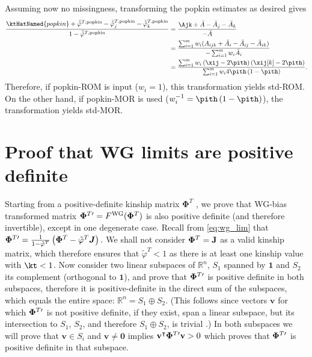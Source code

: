\documentclass[11pt]{article}
\newcommand{\kinMat}[1][T]{%
  \ensuremath{%
    \mathbf{\Phi}^{#1}
  }%
  \xspace%
}%
\newcommand{\kinMatPrime}{%
  \ensuremath{%
    \mathbf{\Phi}^{T\prime}
  }%
  \xspace%
}%
\begin{document}
\begin{appendices}
  Assuming now no missingness, transforming the popkin estimates as desired gives
  \begin{align*}
    \frac{
    \ktHatNamed{popkin}
    + \bar{ \hat{ \varphi } }^{T,\text{popkin}}
    - \bar{ \hat{ \varphi } }_j^{T,\text{popkin}}
    - \bar{ \hat{ \varphi } }_k^{T,\text{popkin}}
    }{
    1 - \bar{ \hat{ \varphi } }^{T,\text{popkin}}
    }
    &=
      \frac{
      \Ajk
      + \bar{A}
      - \bar{A}_j
      - \bar{A}_k
      }{
      - \bar{A}
      }
    \\
    &=
      \frac{
      \sum_{i=1}^m w_i ( A_{ijk} + \bar{A}_i - \bar{A}_{ij} - \bar{A}_{ik} )
      }{
      - \sum_{i=1}^m w_i \bar{A}_i
      }
    \\
    &=
      \frac{
      \sum_{i=1}^m w_i \left( \xij - 2 \pith \right) \left( \xij[k] - 2 \pith \right)
      }{
      \sum_{i=1}^m w_i 4 \pith \left( 1 - \pith \right)
      }
      .
  \end{align*}
  Therefore, if popkin-ROM is input ($w_i=1$), this transformation yields std-ROM.
  On the other hand, if popkin-MOR is used ($w_i^{-1} = \pith \left( 1 - \pith \right)$), the transformation yields std-MOR.
  
  \section{Proof that WG limits are positive definite}

  \label{sec:wg_posdef}

  Starting from a positive-definite kinship matrix \kinMat, we prove that WG-bias transformed matrix $\kinMatPrime = F^\text{WG}( \kinMat )$ is also positive definite (and therefore invertible), except in one degenerate case.
  Recall from \cref{eq:wg_lim} that
  $
  \kinMatPrime
  =
  \frac{1}{1-\tilde{\varphi}^T} \left( \kinMat - \tilde{\varphi}^T \boldsymbol{J} \right)
  .
  $
  We shall not consider $\kinMat = \mathbf{J}$ as a valid kinship matrix, which therefore ensures that $\tilde{\varphi}^T < 1$ as there is at least one kinship value with $\kt < 1$.
  Now consider two linear subspaces of $\mathbb{R}^n$, $S_1$ spanned by $\mathbf{1}$ and $S_2$ its complement (orthogonal to $\mathbf{1}$), and prove that $\kinMatPrime$ is positive definite in both subspaces, therefore it is positive-definite in the direct sum of the subspaces, which equals the entire space: $\mathbb{R}^n = S_1 \oplus S_2$.
  (This follows since vectors $\mathbf{v}$ for which $\kinMatPrime$ is not positive definite, if they exist, span a linear subspace, but its intersection to $S_1$, $S_2$, and therefore $S_1 \oplus S_2$, is trivial \citep{hefferon_linear_2020}.)
  In both subspaces we will prove that $\mathbf{v} \in S_i$ and $\mathbf{v} \ne \mathbf{0}$ implies $\mathbf{v}^\intercal \kinMatPrime \mathbf{v} > 0$ which proves that $\kinMatPrime$ is positive definite in that subspace.


\end{appendices}
\end{document}
